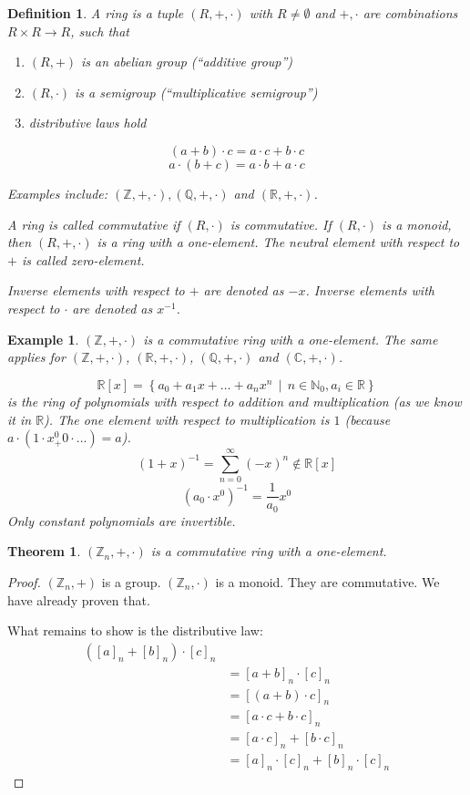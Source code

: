 \documentclass[a4paper,landscape,twocolumn]{article}
\newcommand\setdef[2]{\left\{#1\,\middle|\,#2\right\}}
\newtheorem{theorem}{Theorem}
\newtheorem{defi}{Definition}
\newtheorem{ex}{Example}
\begin{document}
\begin{defi}
  A \emph{ring} is a tuple $(R, +, \cdot)$ with $R \neq \emptyset$ and
  $+, \cdot$ are combinations $R \times R \rightarrow R$, such that
  \begin{enumerate}
    \item $(R, +)$ is an abelian group (\enquote{additive group})
    \item $(R, \cdot)$ is a semigroup (\enquote{multiplicative semigroup})
    \item distributive laws hold
  \end{enumerate}
  \[ (a + b) \cdot c = a \cdot c + b \cdot c \]
  \[ a \cdot (b + c) = a \cdot b + a \cdot c \]

  Examples include: $(\mathbb Z, +, \cdot), (\mathbb Q, +, \cdot)$ and $(\mathbb R, +, \cdot)$.

  A ring is called \emph{commutative} if $(R, \cdot)$ is commutative.
  If $(R, \cdot)$ is a monoid, then $(R, +, \cdot)$ is a ring with a one-element.
  The neutral element with respect to $+$ is called zero-element.

  Inverse elements with respect to $+$ are denoted as $-x$.
  Inverse elements with respect to $\cdot$ are denoted as $x^{-1}$.
\end{defi}

\begin{ex}
  $(\mathbb Z, +, \cdot)$ is a commutative ring with a one-element.
  The same applies for $(\mathbb Z, +, \cdot)$, $(\mathbb R, +, \cdot)$, $(\mathbb Q, +, \cdot)$ and $(\mathbb C, +, \cdot)$.

  \[ \mathbb R[x] = \setdef{a_0 + a_1 x + \dots + a_n x^n}{n \in \mathbb N_0, a_i \in \mathbb R} \]
  is the ring of polynomials with respect to addition and multiplication (as we know it in $\mathbb R$).
  The one element with respect to multiplication is $1$ (because $a \cdot (1 \cdot x^0 _+ 0 \cdot \dots) = a$).
  \[ (1 + x)^{-1} = \sum_{n=0}^\infty (-x)^n \not\in \mathbb R[x] \]
  \[ (a_0 \cdot x^0)^{-1} = \frac1{a_0} x^0 \]
  Only constant polynomials are invertible.
\end{ex}

\begin{theorem}
  \label{satz-2-29}
  $(\mathbb Z_n, +, \cdot)$ is a commutative ring with a one-element.
\end{theorem}

\begin{proof}
  $(\mathbb Z_n, +)$ is a group.
  $(\mathbb Z_n, \cdot)$ is a monoid.
  They are commutative.
  We have already proven that.

  What remains to show is the distributive law:
  \begin{align*}
    ([a]_n + [b]_n) \cdot [c]_n \\
    &= [a + b]_n \cdot [c]_n \\
    &= [(a + b) \cdot c]_n \\
    &= [a\cdot c + b\cdot c]_n \\
    &= [a \cdot c]_n + [b \cdot c]_n \\
    &= [a]_n \cdot [c]_n + [b]_n \cdot [c]_n
  \end{align*}
\end{proof}
\end{document}
